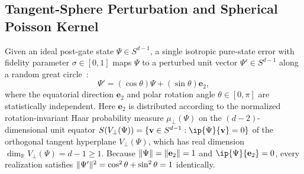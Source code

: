 \subsection{Tangent-Sphere Perturbation and Spherical Poisson Kernel}
\label{sec:poisson-model}

Given an ideal post-gate state $\Psi \in S^{d-1}$, a single isotropic pure-state error with fidelity parameter $\sigma \in [0, 1]$ maps $\Psi$ to a perturbed unit vector $\Psi' \in S^{d-1}$ along a random great circle~\cite{LacallePozoCoronado2019,SahaRoyLacalle2026}:
\begin{equation}
\Psi' = (\cos\theta)\Psi + (\sin\theta)\mathbf{e}_2,
\label{eq:isotropic-step}
\end{equation}
where the equatorial direction $\mathbf{e}_2$ and polar rotation angle $\theta \in [0, \pi]$ are statistically independent. Here $\mathbf{e}_2$ is distributed according to the normalized rotation-invariant Haar probability measure $\mu_\perp(\Psi)$ on the $(d - 2)$-dimensional unit equator $S(V_\perp(\Psi)) = \{\mathbf{v} \in S^{d-1} : \ip{\Psi}{\mathbf{v}} = 0\}$ of the orthogonal tangent hyperplane $V_\perp(\Psi)$, which has real dimension $\dim_{\mathbb{R}} V_\perp(\Psi) = d - 1 \ge 1$. Because $\lVert\Psi\rVert = \lVert\mathbf{e}_2\rVert = 1$ and $\ip{\Psi}{\mathbf{e}_2} = 0$, every realization satisfies $\lVert\Psi'\rVert^2 = \cos^2\theta + \sin^2\theta = 1$ identically.

